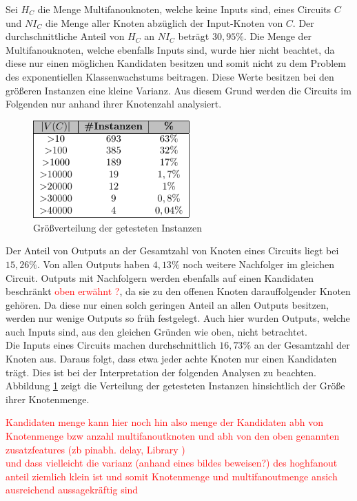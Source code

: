 \documentclass[11pt, a4paper, german]{article}
\begin{document}
Sei $H_C$ die Menge Multifanouknoten, welche keine Inputs sind, eines Circuits $C$ und $NI_C$ die Menge aller Knoten abz\"uglich der Input-Knoten von $C$. Der durchschnittliche Anteil von $H_C$ an $NI_C$ betr\"agt $30,95\%$. Die Menge der Multifanouknoten, welche ebenfalls Inputs sind, wurde hier nicht beachtet, da diese nur einen m\"oglichen Kandidaten besitzen und somit nicht zu dem Problem des exponentiellen Klassenwachstums beitragen. Diese Werte besitzen bei den gr\"o{\ss}eren Instanzen eine kleine Varianz. Aus diesem Grund werden die Circuits im Folgenden nur anhand ihrer Knotenzahl analysiert.\\
   \begin{figure}
		\includegraphics[width = 6cm]{pictures/compiled/instance_sizes_distribution_table}
		\caption{Gr\"o\ss verteilung der getesteten Instanzen}
		\label{bild:sizes_table}
	\end{figure}
 Der Anteil von Outputs an der Gesamtzahl von Knoten eines Circuits liegt bei $15,26\%$. Von allen Outputs haben $4,13\%$ noch weitere Nachfolger im gleichen Circuit. Outputs mit Nachfolgern werden ebenfalls auf einen Kandidaten beschr\"ankt \textcolor{red}{oben erw\"ahnt ?}, da sie zu den offenen Knoten darauffolgender Knoten gehören. Da diese nur einen solch geringen Anteil an allen Outputs besitzen, werden nur wenige Outputs so fr\"uh festgelegt. Auch hier wurden Outputs, welche auch Inputs sind, aus den gleichen Gr\"unden wie oben, nicht betrachtet.\\
 Die Inputs eines Circuits machen durchschnittlich $16,73\%$ an der Gesamtzahl der Knoten aus. Daraus folgt, dass etwa jeder achte Knoten nur einen Kandidaten tr\"agt. Dies ist bei der Interpretation der folgenden Analysen zu beachten.\\
 Abbildung \ref{bild:sizes_table} zeigt die Verteilung der getesteten Instanzen hinsichtlich der Größe  ihrer Knotenmenge.
 
\textcolor{red}{ Kandidaten menge kann hier noch hin also menge der Kandidaten abh von Knotenmenge bzw anzahl multifanoutknoten  und abh von den oben genannten zusatzfeatures (zb pinabh. delay, Library )  \\  und dass vielleicht die varianz (anhand eines bildes beweisen?) des hoghfanout anteil ziemlich klein ist und somit Knotenmenge und multifanoutmenge ansich ausreichend aussagekräftig sind} 
 
\end{document}
